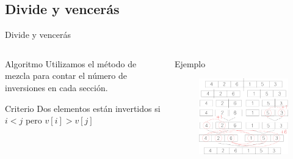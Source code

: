 \subsection{Divide y vencerás}
\begin{frame}{Divide y vencerás}
	\begin{columns}
		
		\begin{column}{4cm}
		\begin{block}{Algoritmo}
		Utilizamos el método de mezcla para contar el número de inversiones en cada sección.\\
		\end{block}	
		
		\begin{block}{Criterio}
		Dos elementos están invertidos si $i < j$ pero $v[i] > v[j]$\\
		\end{block}	
		\end{column}
			
		\begin{column}{6cm}
		\begin{exampleblock}{Ejemplo}
		\begin{figure}[h]
			\centering
			\includegraphics[width=1\textwidth]{Imagenes/esquema.png}
		\end{figure}
		\end{exampleblock}
		\end{column}
		
	\end{columns}
\end{frame}

